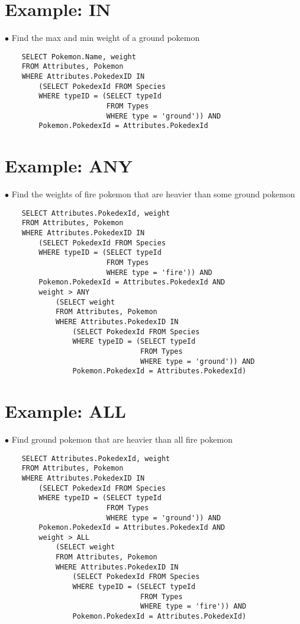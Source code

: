 \documentclass[twoside]{article}
\begin{document}
\section*{Example: IN}
$\bullet$ Find the max and min weight of a ground pokemon
\begin{verbatim}
    SELECT Pokemon.Name, weight
    FROM Attributes, Pokemon
    WHERE Attributes.PokedexID IN
        (SELECT PokedexId FROM Species
        WHERE typeID = (SELECT typeId
                        FROM Types 
                        WHERE type = 'ground')) AND 
        Pokemon.PokedexId = Attributes.PokedexId
\end{verbatim}

\section*{Example: ANY}
$\bullet$ Find the weights of fire pokemon that are heavier than some ground
pokemon
\begin{verbatim}
    SELECT Attributes.PokedexId, weight
    FROM Attributes, Pokemon
    WHERE Attributes.PokedexID IN
        (SELECT PokedexId FROM Species
        WHERE typeID = (SELECT typeId
                        FROM Types 
                        WHERE type = 'fire')) AND 
        Pokemon.PokedexId = Attributes.PokedexId AND
        weight > ANY
            (SELECT weight
            FROM Attributes, Pokemon
            WHERE Attributes.PokedexID IN
                (SELECT PokedexId FROM Species
                WHERE typeID = (SELECT typeId
                                FROM Types 
                                WHERE type = 'ground')) AND 
                Pokemon.PokedexId = Attributes.PokedexId)
\end{verbatim}

\section*{Example: ALL}
$\bullet$ Find ground pokemon that are heavier than all fire pokemon
\begin{verbatim}
    SELECT Attributes.PokedexId, weight
    FROM Attributes, Pokemon
    WHERE Attributes.PokedexID IN
        (SELECT PokedexId FROM Species
        WHERE typeID = (SELECT typeId
                        FROM Types 
                        WHERE type = 'ground')) AND 
        Pokemon.PokedexId = Attributes.PokedexId AND
        weight > ALL
            (SELECT weight
            FROM Attributes, Pokemon
            WHERE Attributes.PokedexID IN
                (SELECT PokedexId FROM Species
                WHERE typeID = (SELECT typeId
                                FROM Types 
                                WHERE type = 'fire')) AND 
                Pokemon.PokedexId = Attributes.PokedexId)
\end{verbatim}
\end{document}
